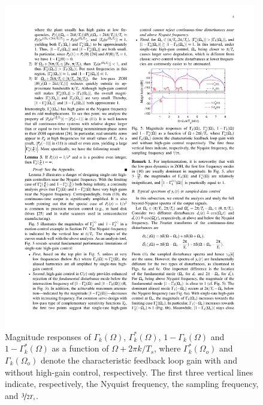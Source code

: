 \documentclass [11pt, proquest] {uwthesis}[2020/02/24]
\begin{document}
\begin{figure}[!ht]
\begin{centering}
\includegraphics[width=11cm]{Spectral-analysis/FIG5.pdf}
\par\end{centering}
\caption{\label{fig:the-first-three}Magnitude responses of $\Gamma_{k}(\Omega)$,
$\Gamma_{k}^{*}(\Omega)$, $1-\Gamma_{k}(\Omega)$ and $1-\Gamma_{k}^{*}(\Omega)$
as a function of $\Omega+2\pi k/T_{s}$, where $\Gamma_{k}^{*}(\Omega_{o})$
and $\Gamma_{k}(\Omega_{o})$ denote the characteristic feedback loop
gain with and without high-gain control, respectively. The first three
vertical lines indicate, respectively, the Nyquist frequency, the
sampling frequency, and $\nicefrac{3}{2T_{s}}$.}
\end{figure}
\end{document}
